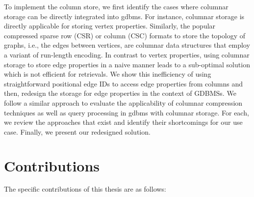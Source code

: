 To implement the column store, we first identify the cases where columnar storage can be directly integrated into \gls{gdbms}. For instance, columnar storage is directly applicable for storing vertex properties. Similarly, the popular compressed sparse row (CSR) or column (CSC) formats to store the topology of graphs, i.e., the edges between vertices, are columnar data structures that employ a variant of run-length encoding. In contrast to vertex properties, using columnar storage to store edge properties in a naive manner leads to a sub-optimal solution which is not efficient for retrievals. We show this inefficiency of using straightforward positional edge IDs to access edge properties from columns and then, redesign the storage for edge properties in the context of GDBMSs. We follow a similar approach to evaluate the applicability of columnar compression techniques as well as query processing in \gls{gdbms} with columnar storage. For each, we review the approaches that exist and identify their shortcomings for our use case. Finally, we present our redesigned solution. 

\section{Contributions}

The specific contributions of this thesis are as follows:

